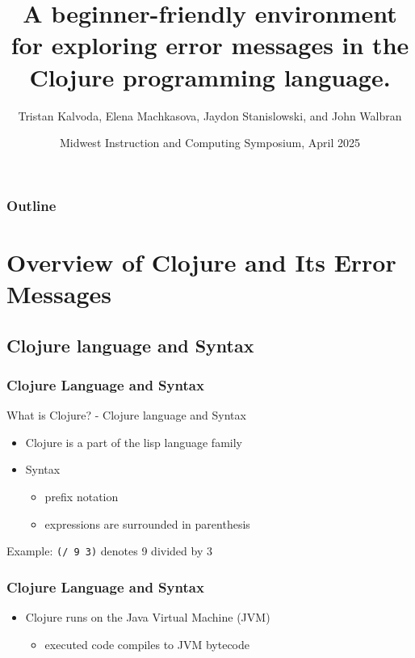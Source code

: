 \documentclass{beamer}
\begin{document}
\title{A beginner-friendly environment for exploring error messages in the Clojure programming language.}
\author{Tristan Kalvoda, Elena Machkasova, Jaydon Stanislowski, and John Walbran}
\date[]  
{Midwest Instruction and Computing Symposium, April 2025}

\begin{frame}
  \titlepage
\end{frame}

\begin{frame}

  \frametitle{Outline}
\tableofcontents
\end{frame}

\section{Overview of Clojure and Its Error Messages}

\subsection{Clojure language and Syntax}
\begin{frame}
\frametitle{Clojure Language and Syntax}
What is Clojure? - Clojure language and Syntax
\begin{itemize}
  \item Clojure is a part of the lisp language family
  \item Syntax
  \begin{itemize}
    \item prefix notation
    \item expressions are surrounded in parenthesis
  \end{itemize}
\end{itemize}
Example: \texttt{(/ 9 3)} denotes 9 divided by 3
\end{frame}

\begin{frame}
  \frametitle{Clojure Language and Syntax}
  \begin{itemize}
    \item Clojure runs on the Java Virtual Machine (JVM)
    \begin{itemize}
      \item executed code compiles to JVM bytecode
    \end{itemize}
  \end{itemize}
\end{frame}
\end{document}
